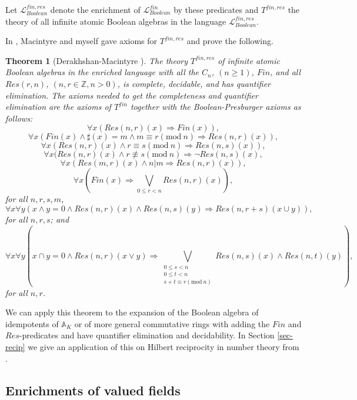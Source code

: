 \documentclass[12pt]{amsart}
\def\A{\mathbb{A}}
\def\Z{\mathbb{Z}}
\newtheorem{thm}{Theorem}[section]
\numberwithin{equation}{section}
\begin{document}
Let $\mathcal{L}_{Boolean}^{fin,res}$ denote the enrichment of $\mathcal{L}_{Boolean}^{fin}$ by these predicates and $T^{fin,res}$ the theory of all infinite atomic Boolean algebras in the language $\mathcal{L}_{Boolean}^{fin,res}$. 

In \cite{DM-bool}, Macintyre and myself gave axioms for $T^{fin,res}$ and prove the following.

\begin{thm}[Derakhshan-Macintyre {\cite{DM-bool}\label{bool2}}] The theory $T^{fin,res}$ of infinite atomic 
Boolean algebras in the enriched language with all the $C_n$, $(n\geq 1)$, $Fin$, and all $Res(r,n)$, $(n,r\in \Z, n>0)$, 
is complete, decidable, and has 
quantifier elimination. The axioms needed to get the completeness and 
quantifier elimination are the axioms of $T^{fin}$ together with the Boolean-Presburger axioms 
as follows: 
$$\forall x (Res(n,r)(x)\Rightarrow Fin(x)),$$
$$\forall x (Fin(x) \wedge \sharp(x)=m \wedge m\equiv r (\mathrm{mod}~n) \Rightarrow Res(n,r)(x)),$$
$$\forall x(Res(n,r)(x) \wedge r\equiv s (\mathrm{mod}~n) \Rightarrow Res(n,s)(x)),$$
$$\forall x(Res(n,r)(x)\wedge r \not\equiv s (\mathrm{mod}~n) \Rightarrow \neg Res(n,s)(x),$$ 
$$\forall x(Res(m,r)(x)\wedge n|m \Rightarrow Res(n,r)(x)),$$
$$\forall x(Fin(x)\Rightarrow \bigvee_{0\leq r< n} Res(n,r)(x)),$$
for all $n,r,s,m$,
$$\forall x \forall y(x\wedge y=0 \wedge Res(n,r)(x) \wedge Res(n,s)(y) \Rightarrow Res(n,r+s)(x\cup y)),$$
for all $n,r,s$; and
$$\forall x \forall y(x\cap y=0 \wedge Res(n,r)(x\vee y) \Rightarrow \bigvee_{\substack{0\leq s<n\\
0\leq t<n\\s+t\equiv r (\mathrm{mod}~n)}} Res(n,s)(x) \wedge Res(n,t)(y)),$$
for all $n,r$.
\end{thm}

We can apply this theorem to the expansion of the Boolean algebra of idempotents of $\A_K$ or of more general commutative rings 
with adding the $Fin$ and $Res$-predicates and have quantifier elimination and decidability. 
In Section \ref{sec-recip} we give an application of this on Hilbert reciprocity in number theory from \cite{DM-ad}.

\medskip

\subsection{\bf Enrichments of valued fields}\label{ssec-venrich} 

\
\end{document}
